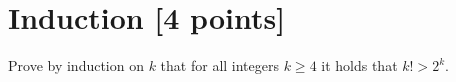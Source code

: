 \newpage
\section{Induction [4 points]}
Prove by induction on $k$ that for all integers $k \ge 4$ it holds that $k! > 2^k$.